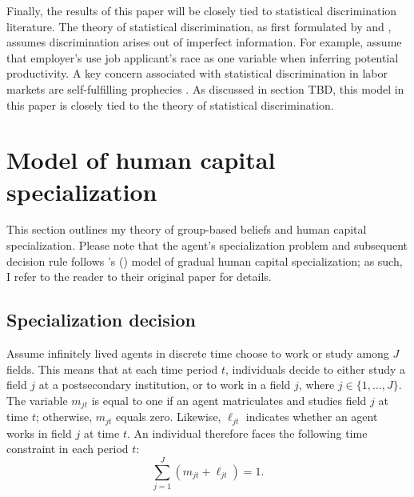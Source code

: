 \documentclass[11 pt]{article}
\newcommand{\toedit}[1]{{\color{gray}#1}}
\newcommand{\toedit}[1]{#1}
\newcommand{\citeposs}[1]{{\citeauthor{#1}'s (\citeyear{#1})}}
\newcommand{\pr}[1]{\left( #1 \right)}
\newcommand{\study}{m} %
\begin{document}
Finally, the results of this paper will be closely tied to statistical discrimination literature. 
The theory of statistical discrimination, as first formulated by \textcite{A72} and \textcite{P72}, assumes discrimination arises out of imperfect information.
For example, \textcite{AC77} assume that employer's use job applicant's race as one variable when inferring potential productivity.
A key concern associated with statistical discrimination in labor markets are self-fulfilling prophecies \textcite{LS83}. 
\toedit{As discussed in section TBD, this model in this paper is closely tied to the theory of statistical discrimination}.

 


\section{Model of human capital specialization}\label{sec:model}

This section outlines my theory of group-based beliefs and human capital specialization.
Please note that the agent's specialization problem and subsequent decision rule follows \citeposs{AF20} model of gradual human capital specialization; as such, I refer to the reader to their original paper for details. 

\subsection{Specialization decision}\label{sec:specialization}

Assume infinitely lived agents in discrete time choose to work or study among $J$ fields.
This means that at each time period $t$, individuals decide to either study a field $j$ at a postsecondary institution, or to work in a field $j$, where $j\in \{1, \dots, J\}$.
The variable $\study_{jt}$ is equal to one if an agent matriculates and studies field $j$ at time $t$; otherwise, $m_{jt}$ equals zero. 
Likewise, $\ell_{jt}$ indicates whether an agent works in field $j$ at time $t$.
An individual therefore faces the following time constraint in each period $t$:
\begin{equation*}
    \sum_{j=1}^J \pr{\study_{jt} + \ell_{jt}} = 1.
\end{equation*}
\end{document}
